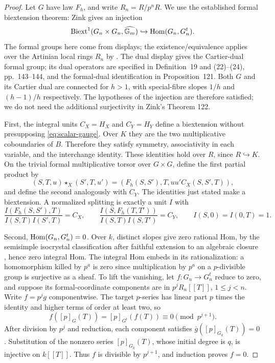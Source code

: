 \documentclass[11pt,a4paper]{article}
\theoremstyle{definition}\newtheorem{remark}[theorem]{Remark}
\begin{document}
\begin{proof}
Let $G$ have law $F_h$, and write $R_n=R/p^nR$. We use the established formal biextension theorem: Zink \cite[\S4.4, Proposition 121 and (243), pp.~241, 246]{Zink} gives an injection
\[
 \operatorname{Biext}^1(G_n\times G_n,\widehat{\mathbb G_m})
 \hookrightarrow\operatorname{Hom}(G_n,G_n^t).
\]
The formal groups here come from displays; the existence/equivalence applies over the Artinian local rings $R_n$ by \cite[Theorem 9, p.~132, or Theorem 103, p.~221]{Zink}. The dual display gives the Cartier-dual formal group; its dual operators are specified in Definition~19 and (22)--(24), pp.~143--144, and the formal-dual identification in Proposition~121. Both $G$ and its Cartier dual are connected for $h>1$, with special-fibre slopes $1/h$ and $(h-1)/h$ respectively. The hypotheses of the injection are therefore satisfied; we do not need the additional surjectivity in Zink's Theorem 122.

First, the integral units $C_X=H_X$ and $C_Y=H_Y$ define a biextension without presupposing \eqref{eq:scalar-gauge}. Over $K$ they are the two multiplicative coboundaries of $B$. Therefore they satisfy symmetry, associativity in each variable, and the interchange identity. These identities hold over $R$, since $R\hookrightarrow K$. On the trivial formal multiplicative torsor over $G\times G$, define the first partial product by
\[
 (S,T,u)\star_X(S',T,u')
  =(F_h(S,S'),T,uu'C_X(S,S',T)),
\]
and define the second analogously with $C_Y$. The identities just stated make a biextension. A normalized splitting is exactly a unit $I$ with
\begin{equation}\label{eq:gauge-split}
 \frac{I(F_h(S,S'),T)}{I(S,T)I(S',T)}=C_X,\qquad
 \frac{I(S,F_h(T,T'))}{I(S,T)I(S,T')}=C_Y,
 \qquad I(S,0)=I(0,T)=1.
\end{equation}

Second, $\operatorname{Hom}(G_n,G_n^t)=0$. Over $k$, distinct slopes give zero rational Hom, by the semisimple isocrystal classification after faithful extension to an algebraic closure \cite[\S1.3, first paragraph of p.~120]{Katz79}, hence zero integral Hom. The integral Hom embeds in its rationalization: a homomorphism killed by $p^a$ is zero since multiplication by $p^a$ on a $p$-divisible group is surjective as a sheaf. To lift the vanishing, let $f:G_n\to G_n^t$ reduce to zero, and suppose its formal-coordinate components are in $p^jR_n[[T]]$, $1\le j<n$. Write $f=p^jg$ componentwise. The target $p$-series has linear part $p$ times the identity and higher terms of order at least two, so
\[
 f([p]_G(T))=[p]_{G^t}(f(T))\equiv0\pmod {p^{j+1}}.
\]
After division by $p^j$ and reduction, each component satisfies $\bar g([p]_{G_k}(T))=0$. Substitution of the nonzero series $[p]_{G_k}(T)$, whose initial degree is $q$, is injective on $k[[T]]$. Thus $f$ is divisible by $p^{j+1}$, and induction proves $f=0$.


\end{proof}
\end{document}
